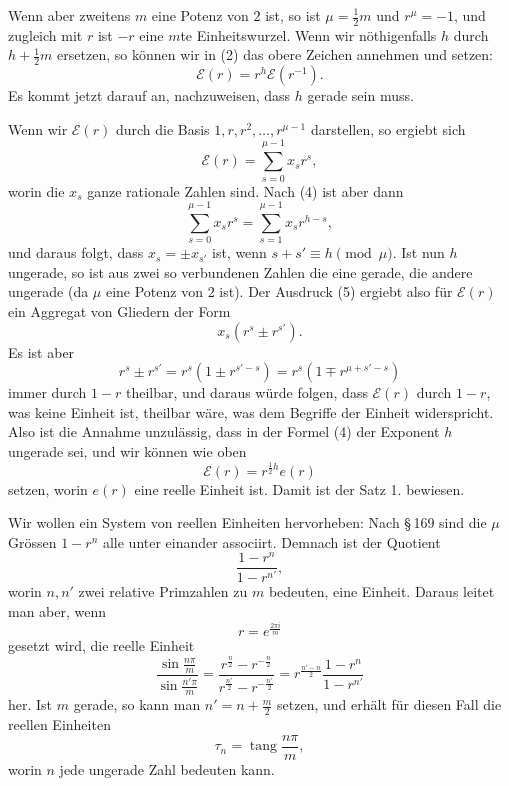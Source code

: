 \documentclass[11pt]{article}
\begin{document}
Wenn aber zweitens $m$ eine Potenz von $2$ ist, so ist $\mu=\frac12m$ und $r^\mu=-1$, und zugleich mit $r$ ist $-r$ eine $m$te Einheitswurzel. Wenn wir nöthigenfalls $h$ durch $h+\frac12m$ ersetzen, so können wir in (2) das obere Zeichen annehmen und setzen:
\begin{equation}
\mathscr E(r)=r^h\mathscr E(r^{-1}).
\tag{4}
\end{equation}
Es kommt jetzt darauf an, nachzuweisen, dass $h$ gerade sein muss.

Wenn wir $\mathscr E(r)$ durch die Basis $1,r,r^2,\ldots,r^{\mu-1}$ darstellen, so ergiebt sich
\begin{equation}
\mathscr E(r)=\sum_{s=0}^{\mu-1}x_sr^s,
\tag{5}
\end{equation}
worin die $x_s$ ganze rationale Zahlen sind. Nach (4) ist aber dann
\[
\sum_{s=0}^{\mu-1}x_sr^s=\sum_{s=1}^{\mu-1}x_sr^{h-s},
\]
und daraus folgt, dass $x_s=\pm x_{s'}$ ist, wenn $s+s'\equiv h\pmod\mu$. Ist nun $h$ ungerade, so ist aus zwei so verbundenen Zahlen die eine gerade, die andere ungerade (da $\mu$ eine Potenz von $2$ ist). Der Ausdruck (5) ergiebt also für $\mathscr E(r)$ ein Aggregat von Gliedern der Form
\[
x_s(r^s\pm r^{s'}).
\]
Es ist aber
\[
r^s\pm r^{s'}=r^s(1\pm r^{s'-s})=r^s(1\mp r^{\mu+s'-s})
\]
immer durch $1-r$ theilbar, und daraus würde folgen, dass $\mathscr E(r)$ durch $1-r$, was keine Einheit ist, theilbar wäre, was dem Begriffe der Einheit widerspricht. Also ist die Annahme unzulässig, dass in der Formel (4) der Exponent $h$ ungerade sei, und wir können wie oben
\[
\mathscr E(r)=r^{\frac12h}e(r)
\]
setzen, worin $e(r)$ eine reelle Einheit ist. Damit ist der Satz 1. bewiesen.

Wir wollen ein System von reellen Einheiten hervorheben: Nach \S\,169 sind die $\mu$ Grössen $1-r^n$ alle unter einander associirt. Demnach ist der Quotient
\[
\frac{1-r^n}{1-r^{n'}},
\]
worin $n,n'$ zwei relative Primzahlen zu $m$ bedeuten, eine Einheit. Daraus leitet man aber, wenn
\[
r=e^{\frac{2\pi i}{m}}
\]
gesetzt wird, die reelle Einheit
\begin{equation}
\frac{\sin\frac{n\pi}{m}}{\sin\frac{n'\pi}{m}}
=\frac{r^{\frac n2}-r^{-\frac n2}}{r^{\frac{n'}2}-r^{-\frac{n'}2}}
=r^{\frac{n'-n}{2}}\frac{1-r^n}{1-r^{n'}}
\tag{6}
\end{equation}
her. Ist $m$ gerade, so kann man $n'=n+\frac m2$ setzen, und erhält für diesen Fall die reellen Einheiten
\begin{equation}
\tau_n=\operatorname{tang}\frac{n\pi}{m},
\tag{7}
\end{equation}
worin $n$ jede ungerade Zahl bedeuten kann.
\end{document}
